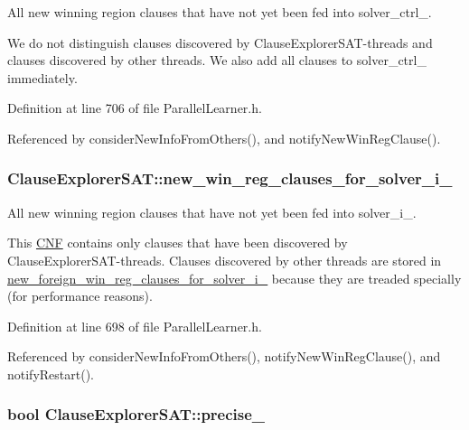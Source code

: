 All new winning region clauses that have not yet been fed into solver\-\_\-ctrl\-\_\-. 

We do not distinguish clauses discovered by Clause\-Explorer\-S\-A\-T-\/threads and clauses discovered by other threads. We also add all clauses to solver\-\_\-ctrl\-\_\- immediately. 

Definition at line 706 of file Parallel\-Learner.\-h.



Referenced by consider\-New\-Info\-From\-Others(), and notify\-New\-Win\-Reg\-Clause().

\hypertarget{classClauseExplorerSAT_a2c3e73b4c0529b9139354a965d34e81f}{
\subsubsection[{new\-\_\-win\-\_\-reg\-\_\-clauses\-\_\-for\-\_\-solver\-\_\-i\-\_\-}]{ Clause\-Explorer\-S\-A\-T\-::new\-\_\-win\-\_\-reg\-\_\-clauses\-\_\-for\-\_\-solver\-\_\-i\-\_\-\hspace{0.3cm}{\ttfamily [protected]}}}\label{classClauseExplorerSAT_a2c3e73b4c0529b9139354a965d34e81f}


All new winning region clauses that have not yet been fed into solver\-\_\-i\-\_\-. 

This \hyperlink{classCNF}{C\-N\-F} contains only clauses that have been discovered by Clause\-Explorer\-S\-A\-T-\/threads. Clauses discovered by other threads are stored in \hyperlink{classClauseExplorerSAT_a70c8edd590d75994ee354d591909cd35}{new\-\_\-foreign\-\_\-win\-\_\-reg\-\_\-clauses\-\_\-for\-\_\-solver\-\_\-i\-\_\-} because they are treaded specially (for performance reasons). 

Definition at line 698 of file Parallel\-Learner.\-h.



Referenced by consider\-New\-Info\-From\-Others(), notify\-New\-Win\-Reg\-Clause(), and notify\-Restart().

\hypertarget{classClauseExplorerSAT_a3edc259c6f39cce098ab18a2dce7f262}{
\subsubsection[{precise\-\_\-}]{\setlength{\rightskip}{0pt plus 5cm}bool Clause\-Explorer\-S\-A\-T\-::precise\-\_\-\hspace{0.3cm}{\ttfamily [protected]}}}\label{classClauseExplorerSAT_a3edc259c6f39cce098ab18a2dce7f262}


